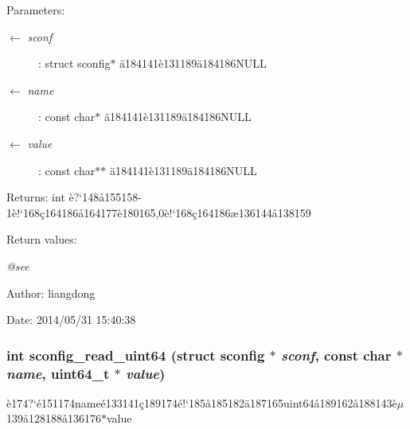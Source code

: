 \begin{Desc}
\item[Parameters:]
\begin{description}
\item[\mbox{$\leftarrow$} {\em sconf}]: struct sconfig$\ast$ \"{a}184141\`{e}131189\"{a}184186NULL \item[\mbox{$\leftarrow$} {\em name}]: const char$\ast$ \"{a}184141\`{e}131189\"{a}184186NULL \item[\mbox{$\leftarrow$} {\em value}]: const char$\ast$$\ast$ \"{a}184141\`{e}131189\"{a}184186NULL \end{description}
\end{Desc}
\begin{Desc}
\item[Returns:]int \`{e}?`148\aa{}155158-1\`{e}!`168\c{c}164186\aa{}164177\`{e}180165,0\`{e}!`168\c{c}164186\ae{}136144\aa{}138159 \end{Desc}
\begin{Desc}
\item[Return values:]
\begin{description}
\item[{\em @see}]\end{description}
\end{Desc}
\begin{Desc}
\item[Author:]liangdong \end{Desc}
\begin{Desc}
\item[Date:]2014/05/31 15:40:38 \end{Desc}
\subsubsection{\setlength{\rightskip}{0pt plus 5cm}int sconfig\_\-read\_\-uint64 (struct sconfig $\ast$ {\em sconf}, const char $\ast$ {\em name}, uint64\_\-t $\ast$ {\em value})}\label{sconfig_8c_a10}


\`{e}174?`\'{e}151174name\'{e}133141\c{c}189174\'{e}!`185\aa{}185182\"{a}187165uint64\aa{}189162\aa{}188143\`{e}$\mu$139\aa{}128188\aa{}136176$\ast$value 

